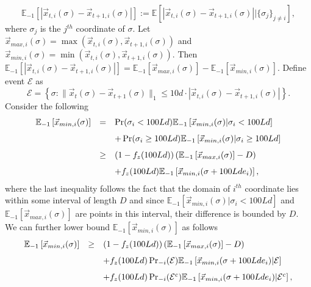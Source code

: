 \documentclass[]{article}
\newcommand{\E}[1]{\mathbb{E}\left[#1\right]}
\newcommand{\Eover}[2]{\mathbb{E}_{#1}\left[#2\right]}
\newcommand{\x}{\vec{x}}
\newcommand{\norm}[1]{\|{#1} \|}
\theoremstyle{definition}
\begin{document}
$$\Eover{-1}{|\x_{t,i}(\sigma) - \x_{t+1,i}(\sigma)|} := \E{|\x_{t,i}(\sigma) - \x_{t+1,i}(\sigma)|\Big| \{\sigma_{j}\}_{j\neq i}},$$
where $\sigma_j$ is the $j^{th}$ coordinate of $\sigma$.  Let $\x_{max,i}(\sigma) = \max\left(\x_{t,i}(\sigma), \x_{t+1,i}(\sigma)\right)$ and $\x_{min,i}(\sigma) = \min\left(\x_{t,i}(\sigma), \x_{t+1,i}(\sigma)\right)$. Then $\Eover{-1}{|\x_{t,i}(\sigma) - \x_{t+1,i}(\sigma)|} = \Eover{-1}{\x_{max,i}(\sigma)} - \Eover{-1}{\x_{min,i}(\sigma)}$. 
Define  event $\mathcal{E}$ as 
$$\mathcal{E} = \left\lbrace \sigma :\norm{\x_{t}(\sigma)-\x_{t+1}(\sigma)}_1 \leq {10  d} \cdot |\x_{t,i}(\sigma)-\x_{t+1,i}(\sigma)|\right\rbrace.$$ 
Consider the following
\begin{equation*}
    \begin{array}{lll}
         \Eover{-1}{\x_{min,i}(\sigma)}  &=& \Pr(\sigma_i < 100Ld) \Eover{-1}{\x_{min,i}(\sigma)|\sigma_i < 100Ld} \vspace{0.1in}\\
         && + \Pr(\sigma_i \geq 100Ld) \Eover{-1}{\x_{min,i}(\sigma) |\sigma_i \geq 100Ld}\vspace{0.1in}\\
         &\geq& \left(1-f_z(100Ld)\right)(\Eover{-1}{\x_{max, i}(\sigma)}-D) \vspace{0.1in}\\
         && + f_z(100Ld)\Eover{-1}{\x_{min,i}(\sigma+100Lde_i)},
\end{array}
\end{equation*}
where the last inequality follows  the fact that the domain of $i^{th}$ coordinate lies within some interval of length $D$ and since $\Eover{-1}{\x_{min,i}(\sigma)|\sigma_i < 100Ld}$ and $\Eover{-1}{\x_{max, i}(\sigma)}$ are points in this interval, their difference is bounded by $D$. We can further lower bound $\Eover{-1}{\x_{min,i}(\sigma)}$ as follows
\begin{equation*}
    \begin{array}{lll}
         \Eover{-1}{\x_{min,i}(\sigma)} 
         &\geq & \left(1-f_z(100Ld)\right)(\Eover{-1}{\x_{max, i}(\sigma)}-D)\vspace{0.1in}\\
         && + f_z(100Ld)\Pr_{-i}(\mathcal{E})\Eover{-1}{\x_{min,i}(\sigma+100Lde_i) | \mathcal{E}} \vspace{0.1in}\\
         && + f_z(100Ld)\Pr_{-i}(\mathcal{E}^c)\Eover{-1}{\x_{min,i}(\sigma+100Lde_i) | \mathcal{E}^c},
\end{array}
\end{equation*}
\end{document}
